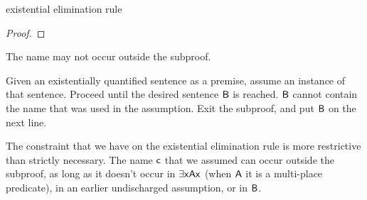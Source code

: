 	\begin{quote}
	\end{quote}

\begin{factboxy}{existential elimination rule}
\begin{proof}
	\open
		 \as{}
	\close
	 
\end{proof}

\small{The name  may not occur outside the subproof.\smallskip

Given an existentially quantified sentence as a premise, assume an instance of that sentence. Proceed until the desired sentence $\mathsf{B}$ is reached. $\mathsf{B}$ cannot contain the name that was used in the assumption. Exit the subproof, and put $\mathsf{B}$ on the next line.
}
\end{factboxy}



\begin{notebox}
The constraint that we have on the existential elimination rule is more restrictive than strictly necessary. The name $\mathsf{c}$ that we assumed can occur outside the subproof, as long as it doesn't occur in $\exists \mathsf{x}\mathsf{Ax}$ (when $\mathsf{A}$ it is a multi-place predicate), in an earlier undischarged assumption, or in $\mathsf{B}$.
\end{notebox}

